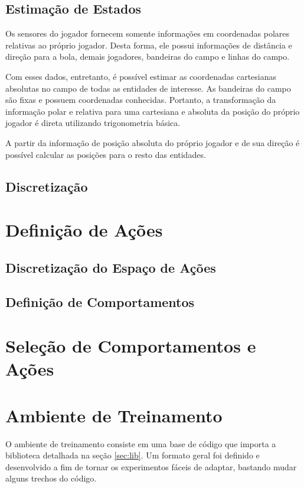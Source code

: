 \subsection{Estimação de Estados}

Os sensores do jogador fornecem somente informações em coordenadas polares relativas ao próprio jogador. Desta forma, ele possui informações de distância e direção para a bola, demais jogadores, bandeiras do campo e linhas do campo. 

Com esses dados, entretanto, é possível estimar as coordenadas cartesianas absolutas no campo de todas as entidades de interesse. As bandeiras do campo são fixas e possuem coordenadas conhecidas. Portanto, a transformação da informação polar e relativa para uma cartesiana e absoluta da posição do próprio jogador é direta utilizando trigonometria básica. 

A partir da informação de posição absoluta do próprio jogador e de sua direção é possível calcular as posições para o resto das entidades.

\subsection{Discretização}

\section{Definição de Ações}

\subsection{Discretização do Espaço de Ações}

\subsection{Definição de Comportamentos}

\section{Seleção de Comportamentos e Ações}

\section{Ambiente de Treinamento}

O ambiente de treinamento consiste em uma base de código que importa a biblioteca detalhada na seção \ref{sec:lib}. Um formato geral foi definido e desenvolvido a fim de tornar os experimentos fáceis de adaptar, bastando mudar alguns trechos do código.

